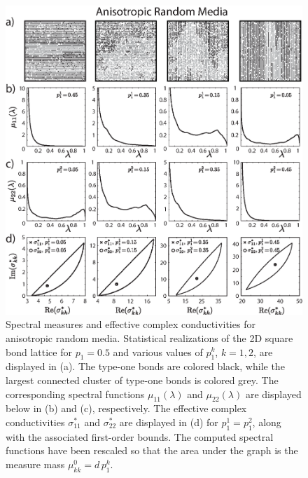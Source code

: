 \documentclass{cmslatex}
\begin{document}
%
\begin{figure}[t]
  \centerline{\includegraphics[scale=0.74]{Anisotropic_RRN_p=0_5.eps}} 
\caption{Spectral measures and effective complex conductivities for
  anisotropic random media. Statistical realizations of the 2D square
  bond lattice for $p_1=0.5$ and various values of $p_1^k$, $k=1,2$,
  are displayed in (a). The type-one bonds are colored black, while
  the largest connected cluster of type-one bonds is colored grey. The
  corresponding spectral functions $\mu_{11}(\lambda)$ and $\mu_{22}(\lambda)$ are
  displayed below in (b) and (c), respectively. The effective complex
  conductivities $\sigma^*_{11}$ and $\sigma^*_{22}$ are displayed in (d) for
  $p_1^1=p_1^2$, along with the associated first-order bounds. The
  computed spectral functions have been rescaled so that the area
  under the graph is the measure mass $\mu^0_{kk}=d\,p_1^k$.   
        }
\label{fig:Anisotropic_Spectral_Measures}
\end{figure}
%
\end{document}
